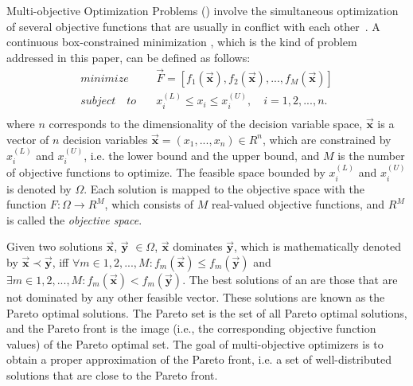 Multi-objective Optimization Problems (\MOPS{}) 
involve the simultaneous optimization of several objective functions that are usually in conflict with each other~\citep{Joel:Kalyanmoy}. 
%
A continuous box-constrained minimization \MOP{}, which is the kind of problem addressed in this paper, can be defined as follows:
\begin{equation}
   \begin{split}
    minimize \quad & \vec{F} = [f_1(\vec{\mathbf{x}}), f_2(\vec{\mathbf{x}}), ..., f_M(\vec{\mathbf{x}})] \\
   subject \quad to \quad &  x_i^{(L)} \leq x_i \leq x_i^{(U)}, \quad i=1,2,..., n. \\
   \end{split}
\end{equation}
where $n$ corresponds to the dimensionality of the decision variable space, $\vec{\mathbf{x}}$ is a vector of $n$ 
decision variables $\vec{\mathbf{x}}=(x_1, ..., x_n) \in R^n$, which are constrained by $x_i^{(L)}$ 
and $x_i^{(U)}$, i.e. the lower bound and the upper bound, and $M$ is the number of objective functions
to optimize.
%
The feasible space bounded by $x_i^{(L)}$ and $x_i^{(U)}$ is denoted by $\Omega$.
Each solution is mapped to the objective space with the function $F : \Omega \rightarrow R^M$, 
which consists of $M$ real-valued objective functions, and $R^M$ is called the \textit{objective space}. 

Given two solutions $\vec{\mathbf{x}}$, $\vec{\mathbf{y}}$ $\in \Omega$, $\vec{\mathbf{x}}$ dominates $\vec{\mathbf{y}}$, 
which is mathematically denoted by $\vec{\mathbf{x}} \prec \vec{\mathbf{y}}$, iff $\forall m \in {1,2,...,M} : 
f_m(\vec{\mathbf{x}}) \leq f_m(\vec{\mathbf{y}})$ and $\exists  m \in {1,2,...,M} : f_m(\vec{\mathbf{x}}) < f_m(\vec{\mathbf{y}})$.
%
The best solutions of an \MOP{} are those that are not dominated by any other feasible vector.
%
These solutions are known as the Pareto optimal solutions.
%
The Pareto set is the set of all Pareto optimal solutions, and the Pareto front is the image (i.e., the corresponding
objective function values) of the Pareto optimal set. 
%
The goal of multi-objective optimizers is to obtain a proper approximation of the Pareto front, i.e.
a set of well-distributed solutions that are close to the Pareto front.

